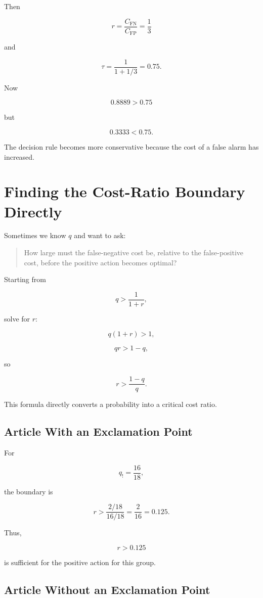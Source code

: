 \documentclass[11pt]{article}
\newcommand{\CFP}{C_{\mathrm{FP}}}
\newcommand{\CFN}{C_{\mathrm{FN}}}
\begin{document}
Then

\[
r
=
\frac{\CFN}{\CFP}
=
\frac{1}{3}
\]

and

\[
\tau
=
\frac{1}{1+1/3}
=
0.75.
\]

Now

\[
0.8889>0.75
\]

but

\[
0.3333<0.75.
\]

The decision rule becomes more conservative because the cost of a false alarm has increased.

\section{Finding the Cost-Ratio Boundary Directly}

Sometimes we know $q$ and want to ask:

\begin{quote}
How large must the false-negative cost be, relative to the false-positive cost, before the positive action becomes optimal?
\end{quote}

Starting from

\[
q>\frac{1}{1+r},
\]

solve for $r$:

\[
q(1+r)>1,
\]

\[
qr>1-q,
\]

so

\[
\boxed{
r>\frac{1-q}{q}.
}
\]

This formula directly converts a probability into a critical cost ratio.

\subsection{Article With an Exclamation Point}

For

\[
q_{!}
=
\frac{16}{18},
\]

the boundary is

\[
r
>
\frac{2/18}{16/18}
=
\frac{2}{16}
=
0.125.
\]

Thus,

\[
\boxed{
r>0.125
}
\]

is sufficient for the positive action for this group.

\subsection{Article Without an Exclamation Point}
\end{document}
